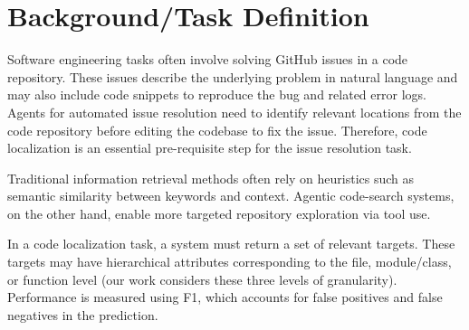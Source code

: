 \section{Background/Task Definition}

Software engineering tasks often involve solving GitHub issues in a code repository. These issues describe the underlying problem in natural language and may also include code snippets to reproduce the bug and related error logs. Agents for automated issue resolution need to identify relevant locations from the code repository before editing the codebase to fix the issue. Therefore, code localization is an essential pre-requisite step for the issue resolution task. 

Traditional information retrieval methods often rely on heuristics such as semantic similarity between keywords and context. Agentic code-search systems, on the other hand, enable more targeted repository exploration via tool use.

In a code localization task, a system must return a set of relevant targets. These targets may have hierarchical attributes corresponding to the file, module/class, or function level (our work considers these three levels of granularity). Performance is measured using F1, which accounts for false positives and false negatives in the prediction.